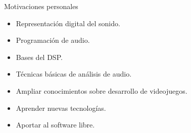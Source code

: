 \begin{frame}{Motivaciones personales}
  \begin{itemize}
  \item Representación digital del sonido.
  \item Programación de audio.\pause

  \item Bases del DSP.
  \item Técnicas básicas de análisis de audio.\pause

  \item Ampliar conocimientos sobre desarrollo de videojuegos.
  \item Aprender nuevas tecnologías.
  \item Aportar al software libre.
  \end{itemize}
\end{frame}

